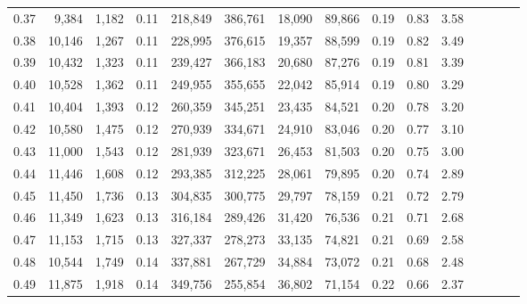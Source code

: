 \begin{tabular}{rrrcrrrrrrrrrrr}
0.37 &   9,384 &  1,182 &                                       0.11 &  218,849 &  386,761 &   18,090 &   89,866 &  0.19 &  0.83 &                         3.58 \\
0.38 &  10,146 &  1,267 &                                       0.11 &  228,995 &  376,615 &   19,357 &   88,599 &  0.19 &  0.82 &                         3.49 \\
0.39 &  10,432 &  1,323 &                                       0.11 &  239,427 &  366,183 &   20,680 &   87,276 &  0.19 &  0.81 &                         3.39 \\
0.40 &  10,528 &  1,362 &                                       0.11 &  249,955 &  355,655 &   22,042 &   85,914 &  0.19 &  0.80 &                         3.29 \\
0.41 &  10,404 &  1,393 &                                       0.12 &  260,359 &  345,251 &   23,435 &   84,521 &  0.20 &  0.78 &                         3.20 \\
0.42 &  10,580 &  1,475 &                                       0.12 &  270,939 &  334,671 &   24,910 &   83,046 &  0.20 &  0.77 &                         3.10 \\
0.43 &  11,000 &  1,543 &                                       0.12 &  281,939 &  323,671 &   26,453 &   81,503 &  0.20 &  0.75 &                         3.00 \\
0.44 &  11,446 &  1,608 &                                       0.12 &  293,385 &  312,225 &   28,061 &   79,895 &  0.20 &  0.74 &                         2.89 \\
0.45 &  11,450 &  1,736 &                                       0.13 &  304,835 &  300,775 &   29,797 &   78,159 &  0.21 &  0.72 &                         2.79 \\
0.46 &  11,349 &  1,623 &                                       0.13 &  316,184 &  289,426 &   31,420 &   76,536 &  0.21 &  0.71 &                         2.68 \\
0.47 &  11,153 &  1,715 &                                       0.13 &  327,337 &  278,273 &   33,135 &   74,821 &  0.21 &  0.69 &                         2.58 \\
0.48 &  10,544 &  1,749 &                                       0.14 &  337,881 &  267,729 &   34,884 &   73,072 &  0.21 &  0.68 &                         2.48 \\
0.49 &  11,875 &  1,918 &                                       0.14 &  349,756 &  255,854 &   36,802 &   71,154 &  0.22 &  0.66 &                         2.37 \\

\end{tabular}
